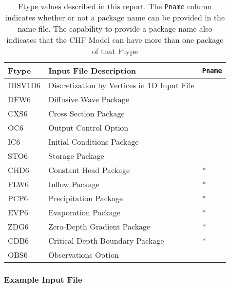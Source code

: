 \begin{table}[H]
\caption{Ftype values described in this report.  The \texttt{Pname} column indicates whether or not a package name can be provided in the name file.  The capability to provide a package name also indicates that the CHF Model can have more than one package of that Ftype}
\small
\begin{center}
\begin{tabular*}{\columnwidth}{l l l}
\hline
\hline
Ftype & Input File Description & \texttt{Pname}\\
\hline
DISV1D6 & Discretization by Vertices in 1D Input File \\
DFW6 & Diffusive Wave Package \\ 
CXS6 & Cross Section Package \\ 
OC6 & Output Control Option \\
IC6 & Initial Conditions Package \\
STO6 & Storage Package \\
CHD6 & Constant Head Package & * \\ 
FLW6 & Inflow Package & * \\ 
PCP6 & Precipitation Package & * \\
EVP6 & Evaporation Package & * \\
ZDG6 & Zero-Depth Gradient Package & * \\ 
CDB6 & Critical Depth Boundary Package & * \\ 
OBS6 & Observations Option \\
\hline 
\end{tabular*}
\label{table:ftype-chf}
\end{center}
\normalsize
\end{table}

\vspace{5mm}
\subsubsection{Example Input File}


